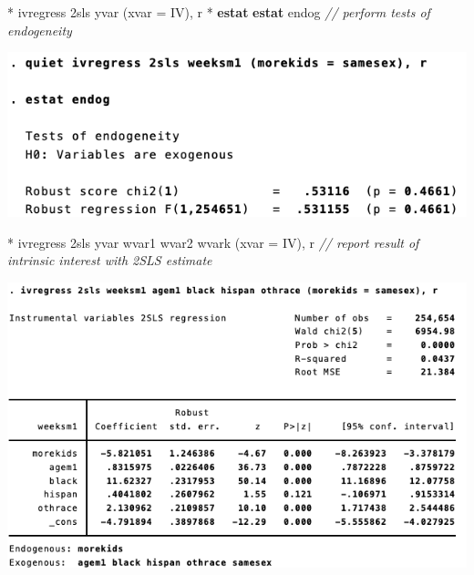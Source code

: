 \documentclass[
  10pt,
  ignorenonframetext,
]{beamer}
\newenvironment{Shaded}{\begin{snugshade}}{\end{snugshade}}
\newcommand{\CommentTok}[1]{\textcolor[rgb]{0.56,0.35,0.01}{\textit{#1}}}
\newcommand{\FunctionTok}[1]{\textcolor[rgb]{0.00,0.00,0.00}{#1}}
\newcommand{\KeywordTok}[1]{\textcolor[rgb]{0.13,0.29,0.53}{\textbf{#1}}}
\newcommand{\NormalTok}[1]{#1}
\begin{document}
\begin{frame}[fragile]{}
\protect\hypertarget{section-2}{}
\small

\begin{Shaded}
\begin{Highlighting}[]
\NormalTok{* ivregress 2sls yvar (xvar = IV), }\FunctionTok{r}
\NormalTok{* }\KeywordTok{estat} \KeywordTok{estat}\NormalTok{ endog}
\CommentTok{// perform tests of endogeneity}
\end{Highlighting}
\end{Shaded}

\begin{center}\includegraphics[width=1\linewidth]{pictures/res5-estatEndog} \end{center}
\end{frame}

\begin{frame}[fragile]{}
\protect\hypertarget{section-3}{}
\small

\begin{Shaded}
\begin{Highlighting}[]
\NormalTok{* ivregress 2sls yvar wvar1 wvar2 wvark (xvar = IV), }\FunctionTok{r}
\CommentTok{// report result of intrinsic interest with 2SLS estimate}
\end{Highlighting}
\end{Shaded}

\begin{center}\includegraphics[width=1\linewidth]{pictures/res6-ivregress2SLS} \end{center}
\end{frame}
\end{document}
